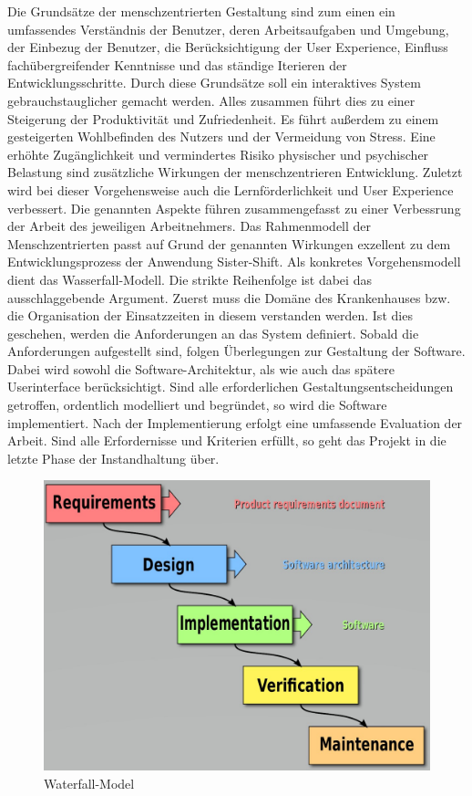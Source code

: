 \documentclass[10pt,a4paper]{article}
\begin{document}
Die Grundsätze der menschzentrierten Gestaltung sind zum einen ein umfassendes Verständnis der Benutzer, deren Arbeitsaufgaben und Umgebung, der Einbezug der Benutzer, die Berücksichtigung der User Experience, Einfluss fachübergreifender Kenntnisse und das ständige Iterieren der Entwicklungsschritte. Durch diese Grundsätze soll ein interaktives System gebrauchstauglicher gemacht werden.
Alles zusammen führt dies zu einer Steigerung der Produktivität und Zufriedenheit. Es führt außerdem zu einem gesteigerten Wohlbefinden des Nutzers und der Vermeidung von Stress. Eine erhöhte Zugänglichkeit und vermindertes Risiko physischer und psychischer Belastung sind zusätzliche Wirkungen der menschzentrieren Entwicklung. Zuletzt wird bei dieser Vorgehensweise auch die Lernförderlichkeit und User Experience verbessert.
Die genannten Aspekte führen zusammengefasst zu einer Verbessrung der Arbeit des jeweiligen Arbeitnehmers. 
Das Rahmenmodell der Menschzentrierten passt auf Grund der genannten Wirkungen exzellent zu dem Entwicklungsprozess der Anwendung Sister-Shift.
Als konkretes Vorgehensmodell dient das Wasserfall-Modell. Die strikte Reihenfolge ist dabei das ausschlaggebende Argument. Zuerst muss die Domäne des Krankenhauses bzw. die Organisation der Einsatzzeiten in diesem verstanden werden. Ist dies geschehen, werden die Anforderungen an das System definiert. Sobald die Anforderungen aufgestellt sind, folgen Überlegungen zur Gestaltung der Software. Dabei wird sowohl die Software-Architektur, als wie auch das spätere Userinterface berücksichtigt. Sind alle erforderlichen Gestaltungsentscheidungen getroffen, ordentlich modelliert und begründet, so wird die Software implementiert. Nach der Implementierung erfolgt eine umfassende Evaluation der Arbeit. Sind alle Erfordernisse und Kriterien erfüllt, so geht das Projekt in die letzte Phase der Instandhaltung über.
\begin{figure}[h]
\includegraphics[scale=0.39]{Bilder/1200px-Waterfall_model.jpg}{\centering}
\caption{Waterfall-Model}
\end{figure}
\end{document}
